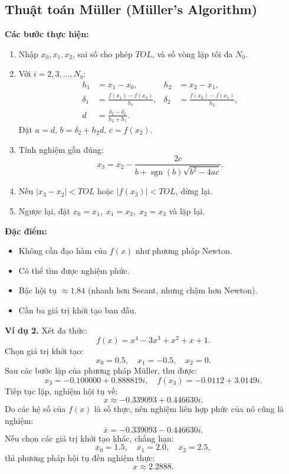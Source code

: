 \subsection{Thuật toán Müller (Müller’s Algorithm)}

\textbf{Các bước thực hiện:}
\begin{enumerate}
    \item Nhập $x_0, x_1, x_2$, sai số cho phép $TOL$, và số vòng lặp tối đa $N_0$.
    \item Với $i = 2, 3, \ldots, N_0$:
    \begin{align*}
        h_1 &= x_1 - x_0, & h_2 &= x_2 - x_1, \\
        \delta_1 &= \frac{f(x_1) - f(x_0)}{h_1}, & \delta_2 &= \frac{f(x_2) - f(x_1)}{h_2}, \\
        d &= \frac{\delta_2 - \delta_1}{h_2 + h_1}.
    \end{align*}
    Đặt $a = d$, $b = \delta_2 + h_2 d$, $c = f(x_2)$.
    \item Tính nghiệm gần đúng:
    \[
    x_3 = x_2 - \frac{2c}{b + \operatorname{sgn}(b)\sqrt{b^2 - 4ac}}.
    \]
    \item Nếu $|x_3 - x_2| < TOL$ hoặc $|f(x_3)| < TOL$, dừng lại.
    \item Ngược lại, đặt $x_0 = x_1, \; x_1 = x_2, \; x_2 = x_3$ và lặp lại.
\end{enumerate}

\textbf{Đặc điểm:}
\begin{itemize}
    \item Không cần đạo hàm của $f(x)$ như phương pháp Newton.
    \item Có thể tìm được nghiệm phức.
    \item Bậc hội tụ $\approx 1.84$ (nhanh hơn Secant, nhưng chậm hơn Newton).
    \item Cần ba giá trị khởi tạo ban đầu.
\end{itemize}

\textbf{Ví dụ 2.}  
Xét đa thức:
\[
f(x) = x^4 - 3x^3 + x^2 + x + 1.
\]
Chọn giá trị khởi tạo:
\[
x_0 = 0.5, \quad x_1 = -0.5, \quad x_2 = 0.
\]
Sau các bước lặp của phương pháp Müller, thu được:
\[
x_3 = -0.100000 + 0.888819i, \quad f(x_3) = -0.0112 + 3.0149i.
\]
Tiếp tục lặp, nghiệm hội tụ về:
\[
x \approx -0.339093 + 0.446630i.
\]
Do các hệ số của $f(x)$ là số thực, nên nghiệm liên hợp phức của nó cũng là nghiệm:
\[
\bar{x} = -0.339093 - 0.446630i.
\]
Nếu chọn các giá trị khởi tạo khác, chẳng hạn:
\[
x_0 = 1.5, \quad x_1 = 2.0, \quad x_2 = 2.5,
\]
thì phương pháp hội tụ đến nghiệm thực:
\[
x \approx 2.2888.
\]

